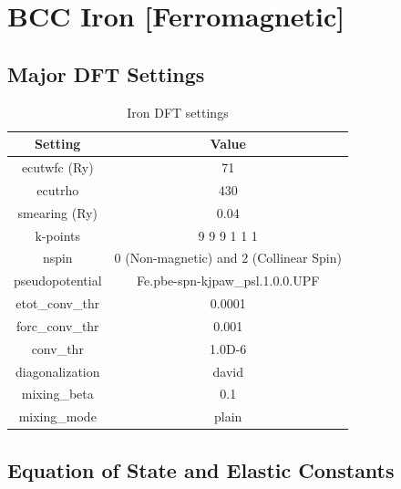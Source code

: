 




\clearpage
\FloatBarrier
\section{BCC Iron [Ferromagnetic]}

\FloatBarrier
\subsection{Major DFT Settings}

\begin{table}[h]
\begin{center}
\renewcommand{\arraystretch}{1.2}
\begin{tabular}{c c}
\hline\hline
Setting & Value \\
\hline\hline
ecutwfc (Ry) & 71 \\
ecutrho & 430 \\
smearing (Ry) & 0.04 \\
k-points &  9 9 9 1 1 1   \\
nspin &   0  (Non-magnetic)  and  2 (Collinear Spin)   \\
pseudopotential &   Fe.pbe-spn-kjpaw\_psl.1.0.0.UPF   \\
etot\_conv\_thr & 0.0001 \\
forc\_conv\_thr & 0.001 \\ 
conv\_thr & 1.0D-6 \\ 
diagonalization & david \\ 
mixing\_beta & 0.1 \\ 
mixing\_mode & plain \\ 
\hline\hline
\end{tabular}
\end{center}
\caption{Iron DFT settings}
\label{table:febccdftsettings}
\end{table}


\FloatBarrier
\subsection{Equation of State and Elastic Constants}

